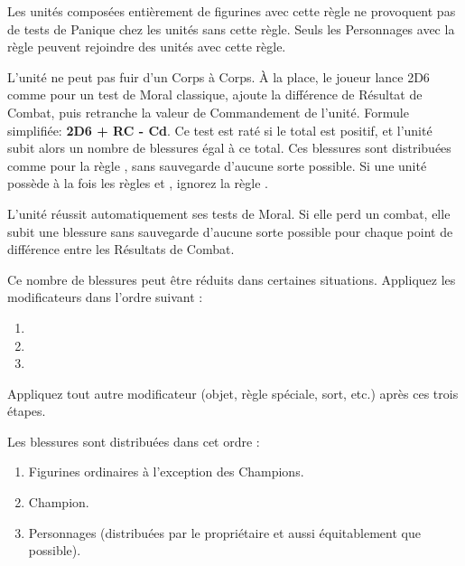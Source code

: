 
Les unités composées entièrement de figurines avec cette règle ne provoquent pas de tests de Panique chez les unités sans cette règle. Seuls les Personnages avec la règle \insignificant{} peuvent rejoindre des unités avec cette règle.


L'unité ne peut pas fuir d'un Corps à Corps. À la place, le joueur lance 2D6 comme pour un test de Moral classique, ajoute la différence de Résultat de Combat, puis retranche la valeur de Commandement de l'unité. Formule simplifiée: \textbf{2D6 + RC - Cd}. Ce test est raté si le total est positif, et l'unité subit alors un nombre de blessures égal à ce total. Ces blessures sont distribuées comme pour la règle \unstable{}, sans sauvegarde d'aucune sorte possible. Si une unité possède à la fois les règles \daemonicinstability{} et \unstable{}, ignorez la règle \unstable{}.

\newpage
{}

L'unité réussit automatiquement ses tests de Moral. Si elle perd un combat, elle subit une blessure sans sauvegarde d'aucune sorte possible pour chaque point de différence entre les Résultats de Combat.

Ce nombre de blessures peut être réduits dans certaines situations. Appliquez les modificateurs dans l'ordre suivant :
\begin{enumerate}
\item {}
\item {}
\item {}
\end{enumerate}
Appliquez tout autre modificateur (objet, règle spéciale, sort, etc.) après ces trois étapes.

Les blessures sont distribuées dans cet ordre :
\begin{enumerate}
\item Figurines ordinaires à l'exception des Champions.
\item Champion.
\item Personnages (distribuées par le propriétaire et aussi équitablement que possible).
\end{enumerate}

